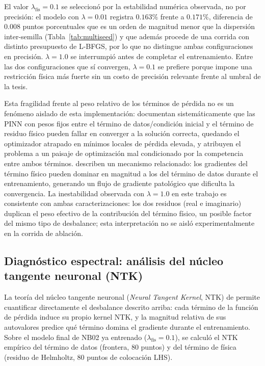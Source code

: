 El valor $\lambda_\text{fís} = 0.1$ se seleccionó por la estabilidad numérica
observada, no por precisión: el modelo con $\lambda = 0.01$ registra
$0.163\%$ frente a $0.171\%$, diferencia de $0.008$ puntos porcentuales que es
un orden de magnitud menor que la dispersión inter-semilla
(Tabla~\ref{tab:multiseed}) y que además procede de una corrida con distinto
presupuesto de L-BFGS, por lo que no distingue ambas configuraciones en
precisión. $\lambda = 1.0$ se interrumpió antes de completar el
entrenamiento. Entre las dos configuraciones que sí convergen,
$\lambda = 0.1$ se prefiere porque impone una restricción física más fuerte sin
un costo de precisión relevante frente al umbral de la tesis.

Esta fragilidad frente al peso relativo de los términos de pérdida no es un
fenómeno aislado de esta implementación: \textcite{krishnapriyan2021characterizing}
documentan sistemáticamente que las PINN con pesos fijos entre el término de
datos/condición inicial y el término de residuo físico pueden fallar en
converger a la solución correcta, quedando el optimizador atrapado en mínimos
locales de pérdida elevada, y atribuyen el problema a un paisaje de
optimización mal condicionado por la competencia entre ambos términos. \textcite{wang2021failure}
describen un mecanismo relacionado: los gradientes del término físico pueden
dominar en magnitud a los del término de datos durante el entrenamiento,
generando un flujo de gradiente patológico que dificulta la convergencia. La
inestabilidad observada con $\lambda = 1.0$ en este trabajo es consistente
con ambas caracterizaciones: los dos residuos (real e imaginario) duplican el
peso efectivo de la contribución del término físico, un posible factor del
mismo tipo de desbalance; esta interpretación no se aisló experimentalmente en
la corrida de ablación.

\subsection{Diagnóstico espectral: análisis del núcleo tangente neuronal (NTK)}
\label{sec:ntk_analisis}

La teoría del núcleo tangente neuronal (\textit{Neural Tangent Kernel}, NTK)
de \textcite{wang2022ntk} permite cuantificar directamente el desbalance
descrito arriba: cada término de la función de pérdida induce su propio
kernel NTK, y la magnitud relativa de sus autovalores predice qué término
domina el gradiente durante el entrenamiento. Sobre el modelo final de NB02
ya entrenado ($\lambda_\text{fís} = 0.1$), se calculó el NTK empírico del
término de datos (frontera, 80 puntos) y del término de física (residuo de
Helmholtz, 80 puntos de colocación LHS).

